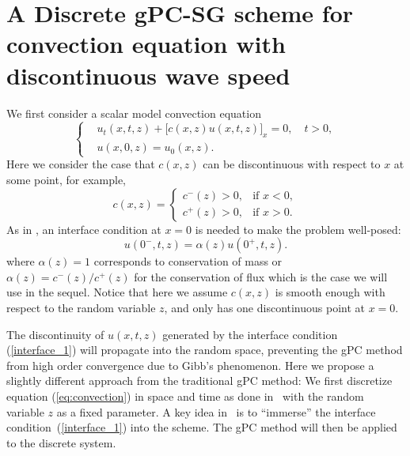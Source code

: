\documentclass[12pt]{article}
\theoremstyle{plain}
\theoremstyle{remark}
\theoremstyle{remark}
\theoremstyle{remark}
\numberwithin{equation}{section}
\begin{document}
\section{A Discrete gPC-SG scheme for convection equation with discontinuous wave speed}


We first consider a scalar model convection equation 
\begin{equation}\label{eq:convection}
  \left\{
  \begin{aligned}
    &u_t(x,t,z) + \big[c(x,z)u(x,t,z)\big]_x = 0,\quad t>0, \\
    &u(x, 0, z) = u_0(x, z).
  \end{aligned}
  \right.
\end{equation}
Here we consider the case that $c(x, z)$ can be discontinuous with respect to $x$ at some point, for example,
\begin{equation}
  c(x, z) = 
  \begin{cases}
    c^-(z)>0, & \text{if $x<0$}, \\
    c^+(z)>0, & \text{if $x>0$}.
  \end{cases}
\end{equation}
As in \cite{Jin:2009pro}, an interface condition at $x = 0$ is needed to make the problem well-posed:
\begin{equation}\label{interface_1}
  u(0^-,t, z) = \alpha(z)u(0^+,t,z).
\end{equation}
where $\alpha(z) = 1$ corresponds to conservation of mass or $\alpha(z) = c^-(z) / c^+(z)$ for the conservation of flux which is the case we will use in the sequel. Notice that here we assume $c(x,z)$ is smooth enough with respect to the random variable $z$, and only has one discontinuous point at $x = 0$.

The discontinuity of $u(x,t,z)$ generated by the interface condition (\ref{interface_1}) will propagate into the random space, preventing the gPC method from
 high order convergence due to Gibb's phenomenon. Here we propose a slightly different approach from the traditional gPC method: We first discretize equation (\ref{eq:convection}) in space and time as done in~\cite{Qi:2013byba} with the random variable $z$ as a fixed parameter. A key idea in~\cite{Qi:2013byba} is to ``immerse'' the interface condition~(\ref{interface_1}) into the scheme. The gPC method will then be applied to the discrete system.
\end{document}
